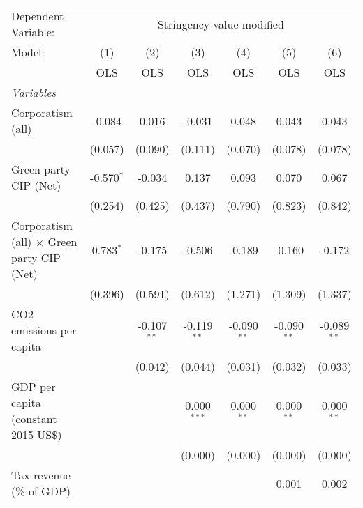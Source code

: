 
\begingroup
\centering
\begin{tabular}{lcccccc}
   \toprule
   Dependent Variable: & \multicolumn{6}{c}{Stringency value modified}\\
   Model:                                            & (1)          & (2)           & (3)           & (4)           & (5)           & (6)\\  
                                                     &  OLS         & OLS           & OLS           & OLS           & OLS           & OLS\\  
   \midrule
   \emph{Variables}\\
   Corporatism (all)                                 & -0.084       & 0.016         & -0.031        & 0.048         & 0.043         & 0.043\\   
                                                     & (0.057)      & (0.090)       & (0.111)       & (0.070)       & (0.078)       & (0.078)\\   
   Green party CIP (Net)                             & -0.570$^{*}$ & -0.034        & 0.137         & 0.093         & 0.070         & 0.067\\   
                                                     & (0.254)      & (0.425)       & (0.437)       & (0.790)       & (0.823)       & (0.842)\\   
   Corporatism (all) $\times$ Green party CIP (Net)  & 0.783$^{*}$  & -0.175        & -0.506        & -0.189        & -0.160        & -0.172\\   
                                                     & (0.396)      & (0.591)       & (0.612)       & (1.271)       & (1.309)       & (1.337)\\   
   CO2 emissions per capita                          &              & -0.107$^{**}$ & -0.119$^{**}$ & -0.090$^{**}$ & -0.090$^{**}$ & -0.089$^{**}$\\   
                                                     &              & (0.042)       & (0.044)       & (0.031)       & (0.032)       & (0.033)\\   
   GDP per capita (constant 2015 US\$)               &              &               & 0.000$^{***}$ & 0.000$^{**}$  & 0.000$^{**}$  & 0.000$^{**}$\\   
                                                     &              &               & (0.000)       & (0.000)       & (0.000)       & (0.000)\\   
   Tax revenue (\% of GDP)                           &              &               &               &               & 0.001         & 0.002\\   

\end{tabular}
